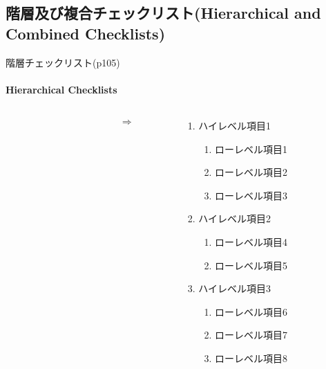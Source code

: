 \subsection{階層及び複合チェックリスト(Hierarchical and Combined Checklists)}
\begin{frame}{階層チェックリスト(p105)}
\framesubtitle{Hierarchical Checklists }
\begin{columns}
    \begin{column}{0.35\textwidth}
    \end{column}
    \begin{column}{0.05\textwidth}
    \Huge\[\Rightarrow\]
    \end{column}
    \begin{column}{0.5\textwidth}
    \begin{enumerate}
    \item ハイレベル項目1
        \begin{enumerate}
        \item ローレベル項目1
        \item ローレベル項目2
        \item ローレベル項目3
        \end{enumerate}
    \item ハイレベル項目2
        \begin{enumerate}
        \item ローレベル項目4
        \item ローレベル項目5
        \end{enumerate}
    \item ハイレベル項目3
        \begin{enumerate}
        \item ローレベル項目6
        \item ローレベル項目7
        \item ローレベル項目8
        \end{enumerate}
    \end{enumerate}
    \end{column}
\end{columns}
\end{frame}
